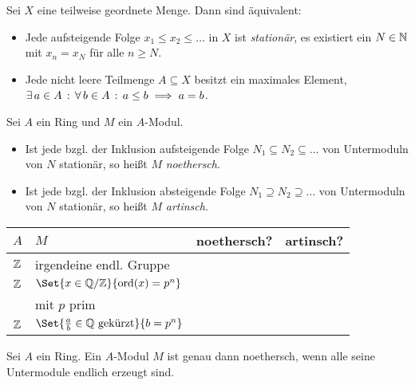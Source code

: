 \documentclass{cheat-sheet}
\newcommand{\cmark}{\ding{51}}
\newcommand{\xmark}{\ding{55}}
\DeclareMathOperator{\ord}{ord} %
\begin{document}


\begin{prop}
  Sei $X$ eine teilweise geordnete Menge.
  Dann sind äquivalent:
  \begin{itemize}
    \item Jede aufsteigende Folge $x_1 \leq x_2 \leq \ldots$ in $X$ ist \emph{stationär}, \dh{} es existiert ein $N \in \mathbb{N}$ mit $x_n = x_N$ für alle $n \geq N$.
    \item Jede nicht leere Teilmenge $A \subseteq X$ besitzt ein maximales Element, \dh{} $\exists \, {a \in A} \,:\, \forall \, {b \in A} \,:\, a \leq b \implies a = b$.
  \end{itemize}
\end{prop}

\begin{defn}
  Sei $A$ ein Ring und $M$ ein $A$-Modul.
  \begin{itemize}
    \item Ist jede bzgl. der Inklusion aufsteigende Folge $N_1 \subseteq N_2 \subseteq \ldots$ von Untermoduln von $N$ stationär, so heißt $M$ \emph{noethersch}.
    \item Ist jede bzgl. der Inklusion absteigende Folge $N_1 \supseteq N_2 \supseteq \ldots$ von Untermoduln von $N$ stationär, so heißt $M$ \emph{artinsch}.
  \end{itemize}
\end{defn}

\begin{bspe}
  \begin{minipage}[t]{0.88 \linewidth}
    \begin{tabular}[t]{l | l | l | l}
      $A$ & $M$ & noethersch? & artinsch? \\ \hline
      $\mathbb{Z}$ & irgendeine endl. Gruppe & \cmark & \cmark \\
      $\mathbb{Z}$ & $\Set{x \in \Q/\Z}{\ord(x) = p^n}$ & \xmark & \cmark \\
      & mit $p$ prim & & \\
      $\mathbb{Z}$ & $\Set{\tfrac{a}{b} \in \Q \text{ gekürzt}}{b = p^n}$ & \xmark & \xmark
    \end{tabular}
  \end{minipage}
\end{bspe}

\begin{prop}
  Sei $A$ ein Ring.
  Ein $A$-Modul $M$ ist genau dann noethersch, wenn alle seine Untermodule endlich erzeugt sind.
\end{prop}
\end{document}
